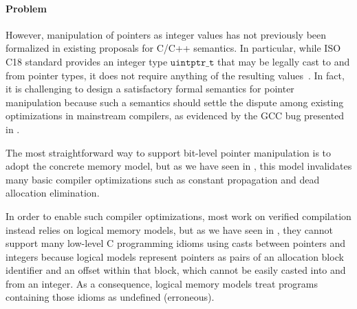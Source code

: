 



\paragraph{Problem}


However, manipulation of pointers as integer values has not previously been formalized in existing
proposals for C/C++ semantics.  In particular, while ISO C18 standard provides an integer type
$\mathtt{uintptr\_t}$ that may be legally cast to and from pointer types, it does not require
anything of the resulting values~\cite[\S7.20.1.4p1]{c18}.  In fact, it is challenging to design a
satisfactory formal semantics for pointer manipulation because such a semantics should settle the
dispute among existing optimizations in mainstream compilers, as evidenced by the GCC bug presented
in .

The most straightforward way to support bit-level pointer manipulation is to adopt the concrete
memory model, but as we have seen in , this model
invalidates many basic compiler optimizations such as constant propagation and dead allocation
elimination.


In order to enable such compiler optimizations, most work on verified compilation instead relies on
logical memory models, but as we have seen in , they cannot support many
low-level C programming idioms using casts between pointers and integers because logical models
represent pointers as pairs of an allocation block identifier and an offset within that block, which
cannot be easily casted into and from an integer.  As a consequence, logical memory models treat
programs containing those idioms as undefined (\ie erroneous).

